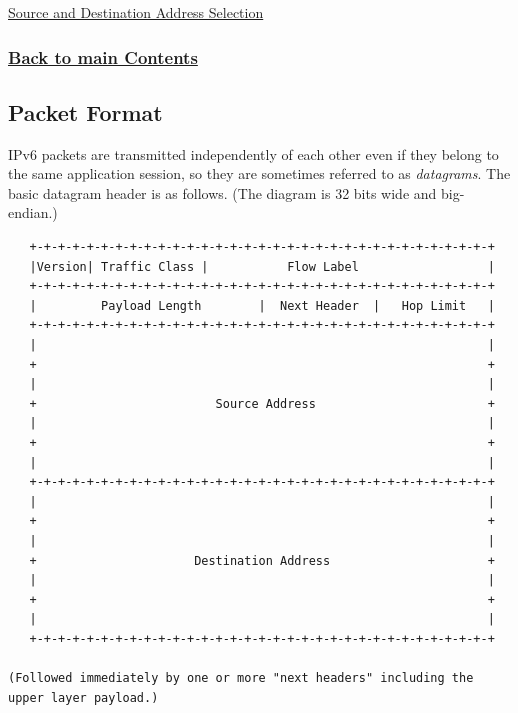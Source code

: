 \documentclass[
]{article}
\begin{document}
\hyperref[source-and-destination-address-selection]{Source and
Destination Address Selection}

\subsubsection{\texorpdfstring{\hyperref[list-of-contents]{Back to main
Contents}}{Back to main Contents}}\label{back-to-main-contents-1}

\pagebreak

\subsection{Packet Format}\label{packet-format}

IPv6 packets are transmitted independently of each other even if they
belong to the same application session, so they are sometimes referred
to as \emph{datagrams}. The basic datagram header is as follows. (The
diagram is 32 bits wide and big-endian.)

\begin{verbatim}
   +-+-+-+-+-+-+-+-+-+-+-+-+-+-+-+-+-+-+-+-+-+-+-+-+-+-+-+-+-+-+-+-+
   |Version| Traffic Class |           Flow Label                  |
   +-+-+-+-+-+-+-+-+-+-+-+-+-+-+-+-+-+-+-+-+-+-+-+-+-+-+-+-+-+-+-+-+
   |         Payload Length        |  Next Header  |   Hop Limit   |
   +-+-+-+-+-+-+-+-+-+-+-+-+-+-+-+-+-+-+-+-+-+-+-+-+-+-+-+-+-+-+-+-+
   |                                                               |
   +                                                               +
   |                                                               |
   +                         Source Address                        +
   |                                                               |
   +                                                               +
   |                                                               |
   +-+-+-+-+-+-+-+-+-+-+-+-+-+-+-+-+-+-+-+-+-+-+-+-+-+-+-+-+-+-+-+-+
   |                                                               |
   +                                                               +
   |                                                               |
   +                      Destination Address                      +
   |                                                               |
   +                                                               +
   |                                                               |
   +-+-+-+-+-+-+-+-+-+-+-+-+-+-+-+-+-+-+-+-+-+-+-+-+-+-+-+-+-+-+-+-+

(Followed immediately by one or more "next headers" including the
upper layer payload.)
\end{verbatim}
\end{document}
